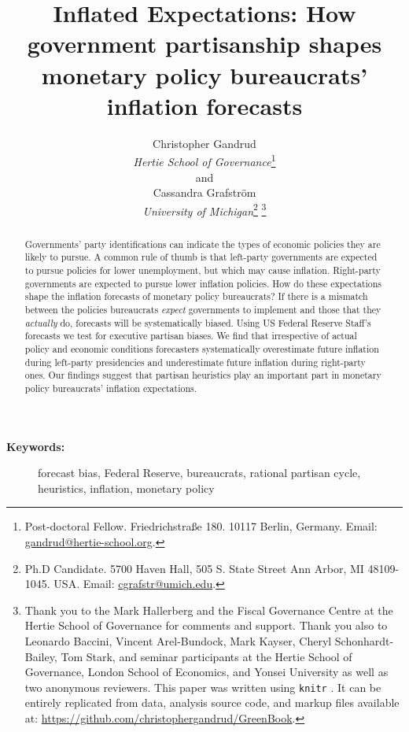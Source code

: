 \documentclass[a4paper]{article}
\title{Inflated Expectations: How government partisanship shapes monetary policy bureaucrats' inflation forecasts}
\author{Christopher Gandrud \\
                {\emph{Hertie School of Governance}}\footnote{Post-doctoral Fellow. Friedrichstra{\ss}e 180. 10117 Berlin, Germany. Email: \href{mailto:gandrud@hertie-school.org}{gandrud@hertie-school.org}.} \\
                and \\
            Cassandra Grafstr\"{o}m \\
                {\emph{University of Michigan}}\footnote{Ph.D Candidate. 5700 Haven Hall, 505 S. State Street
                Ann Arbor, MI 48109-1045. USA. Email: \href{mailto:cgrafstr@umich.edu}{cgrafstr@umich.edu}.} \footnote{Thank you to the Mark Hallerberg and the Fiscal Governance Centre at the Hertie School of Governance for comments and support. Thank you also to Leonardo Baccini, Vincent Arel-Bundock, Mark Kayser, Cheryl Schonhardt-Bailey, Tom Stark, and seminar participants at the Hertie School of Governance, London School of Economics, and Yonsei University as well as two anonymous reviewers. This paper was written using {\tt{knitr}} \citep{knitr2013}. It can be entirely replicated from data, analysis source code, and markup files available at: {\url{https://github.com/christophergandrud/GreenBook}}.}}
\begin{document}
\maketitle

\begin{abstract}

Governments' party identifications can indicate the types of economic policies they are likely to pursue. A common rule of thumb is that left-party governments are expected to pursue policies for lower unemployment, but which may cause inflation. Right-party governments are expected to pursue lower inflation policies. How do these expectations shape the inflation forecasts of monetary policy bureaucrats? If there is a mismatch between the policies bureaucrats \emph{expect} governments to implement and those that they \emph{actually} do, forecasts will be systematically biased. Using US Federal Reserve Staff’s forecasts we test for executive partisan biases. We find that irrespective of actual policy and economic conditions forecasters systematically overestimate future inflation during left-party presidencies and underestimate future inflation during right-party ones. Our findings suggest that partisan heuristics play an important part in monetary policy bureaucrats' inflation expectations.

\end{abstract}

\begin{description}
  \item [{\textbf{Keywords:}}] forecast bias, Federal Reserve, bureaucrats, rational partisan cycle, heuristics, inflation, monetary policy
\end{description}

\vspace{0.3cm}
\end{document}
